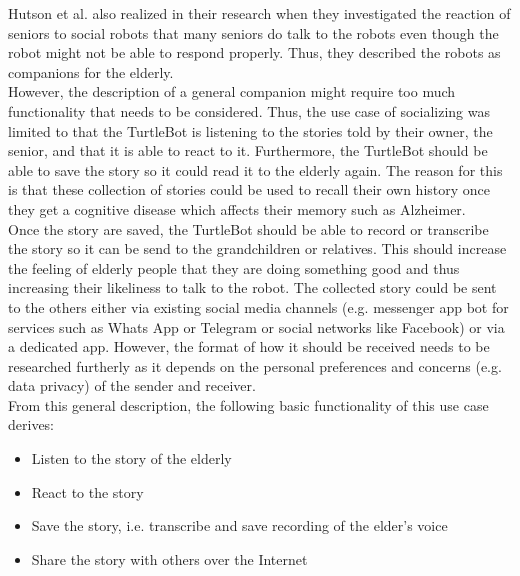 \documentclass[plainarticle,zihtitle,english,final,hyperref,utf8]{zihpub}
\begin{document}
\newline
Hutson et al. \cite{hutson11} also realized in their research when they investigated the reaction of seniors to social robots that many seniors do talk to the robots even though the robot might not be able to respond properly. Thus, they described the robots as companions for the elderly. \\
However, the description of a general companion might require too much functionality that needs to be considered. Thus, the use case of socializing was limited to that the TurtleBot is listening to the stories told by their owner, the senior, and that it is able to react to it. Furthermore, the TurtleBot should be able to save the story so it could read it to the elderly again. The reason for this is that these collection of stories could be used to recall their own history once they get a cognitive disease which affects their memory such as Alzheimer. \\
Once the story are saved, the TurtleBot should be able to record or transcribe the story so it can be send to the grandchildren or relatives. This should increase the feeling of elderly people that they are doing something good and thus increasing their likeliness to talk to the robot. The collected story could be sent to the others either via existing social media channels (e.g. messenger app bot for services such as Whats App or Telegram or social networks like Facebook) or via a dedicated app. However, the format of how it should be received needs to be researched furtherly as it depends on the personal preferences and concerns (e.g. data privacy) of the sender and receiver.\\
\newline
From this general description, the following basic functionality of this use case derives:
\begin{itemize}
    \item Listen to the story of the elderly
    \item React to the story
    \item Save the story, i.e. transcribe and save recording of the elder's voice
    \item Share the story with others over the Internet
\end{itemize}
\bigskip
\end{document}
